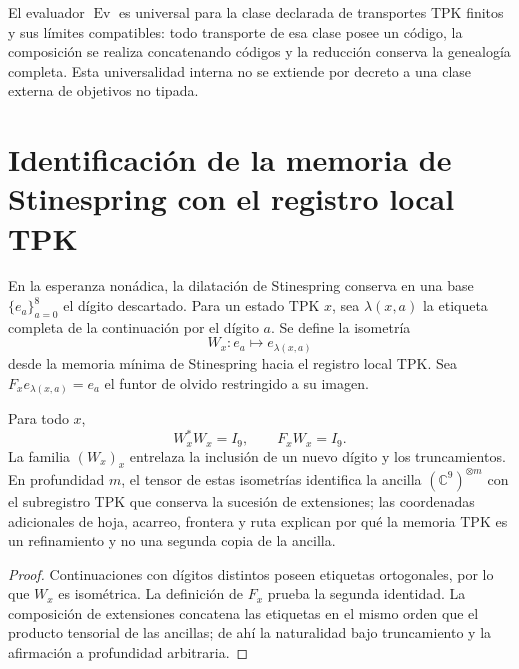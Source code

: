 \begin{corollary}
\label{cor:cpe-universalidad-genealogica}
El evaluador \(\operatorname{Ev}\) es universal para la clase declarada de
transportes TPK finitos y sus límites compatibles: todo transporte de esa
clase posee un código, la composición se realiza concatenando códigos y la
reducción conserva la genealogía completa. Esta universalidad interna no se
extiende por decreto a una clase externa de objetivos no tipada.
\end{corollary}

\section{Identificación de la memoria de Stinespring con el registro local TPK}
\label{sec:cpe-stinespring-tpk}

En la esperanza nonádica, la dilatación de Stinespring conserva en una base
\(\{e_a\}_{a=0}^8\) el dígito descartado. Para un estado TPK \(x\), sea
\(\lambda(x,a)\) la etiqueta completa de la continuación por el dígito
\(a\). Se define la isometría
\[
 W_x:e_a\longmapsto e_{\lambda(x,a)}
\]
desde la memoria mínima de Stinespring hacia el registro local TPK\@. Sea
\(F_xe_{\lambda(x,a)}=e_a\) el funtor de olvido restringido a su imagen.

\begin{theorem}
\label{thm:cpe-stinespring-tpk}
Para todo \(x\),
\[
 W_x^*W_x=I_9,
 \qquad F_xW_x=I_9.
\]
La familia \((W_x)_x\) entrelaza la inclusión de un nuevo dígito y los
truncamientos. En profundidad \(m\), el tensor de estas isometrías identifica
la ancilla \((\mathbb C^9)^{\otimes m}\) con el subregistro TPK que conserva
la sucesión de extensiones; las coordenadas adicionales de hoja, acarreo,
frontera y ruta explican por qué la memoria TPK es un refinamiento y no una
segunda copia de la ancilla.
\end{theorem}

\begin{proof}
Continuaciones con dígitos distintos poseen etiquetas ortogonales, por lo
que \(W_x\) es isométrica. La definición de \(F_x\) prueba la segunda
identidad. La composición de extensiones concatena las etiquetas en el mismo
orden que el producto tensorial de las ancillas; de ahí la naturalidad bajo
truncamiento y la afirmación a profundidad arbitraria.
\end{proof}

